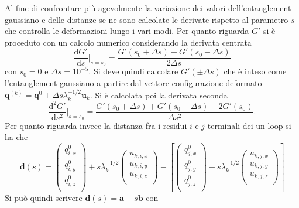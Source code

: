 Al fine di confrontare più agevolmente la variazione dei valori dell'entanglement gaussiano e delle distanze se ne sono calcolate le  derivate rispetto al parametro $ s $ che controlla le deformazioni lungo i vari modi. 
Per quanto riguarda $ G' $ si è proceduto con un calcolo numerico considerando la derivata centrata 
\begin{equation}
\frac{\mathrm{d}G'}{\mathrm{d}s} \bigg|_{s=s_0}  = \frac{G'(s_0 + \Delta s) - G'(s_0 - \Delta s)}{2 \Delta s} 
\end{equation}
con $s_0 = 0  $ e $\Delta s = 10^{-5}  $. Si deve quindi calcolare $ G'(\pm \Delta s) $ che è inteso come l'entanglement gaussiano a partire dal vettore configurazione deformato $ \mathbf{q}^{(k)} = \mathbf{q}^0 \pm  \Delta s \lambda_{k}^{-1/2} \mathbf{u}_k$. 
Si è calcolata poi la derivata seconda 
\begin{equation}
\frac{\mathrm{d}^2G'}{\mathrm{d}s^2} \bigg|_{s=s_0}  = \frac{G'(s_0 + \Delta s) + G'(s_0 - \Delta s) - 2 G'(s_0)}{\Delta s^2}.
\end{equation}
Per quanto riguarda invece la distanza fra i residui $  i $ e $ j $ terminali dei un loop si ha che
\begin{equation}
\mathbf{d} (s) =
\left(
\begin{array}{ccc}
q^{0}_{i,x} \\
q^{0}_{i,y} \\
q^{0}_{i,z} \\                       
\end{array}
\right) + s \lambda_{k}^{-1/2}
\left(
\begin{array}{ccc}
u_{k,i,x} \\
u_{k,i,y} \\
u_{k,i,z} \\
\end{array}
\right) - 
\left[
\left(
\begin{array}{ccc}
q^{0}_{j,x} \\
q^{0}_{j,y} \\
q^{0}_{j,z} \\
\end{array}
\right) + s \lambda_{k}^{-1/2}
\left(
\begin{array}{ccc}
u_{k,j,x} \\
u_{k,j,y} \\
u_{k,j,z} \\
\end{array}
\right)
\right]
\end{equation}
Si può quindi scrivere $ \mathbf{d} (s) = \mathbf{a} + s \mathbf{b} $ con
